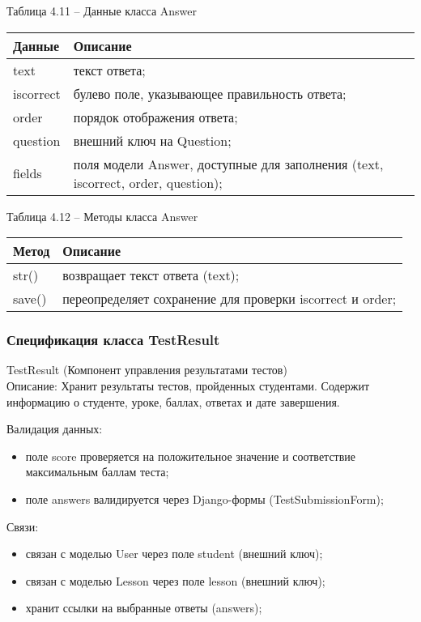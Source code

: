 Таблица 4.11 – Данные класса Answer \\
\begin{tabular}{|p{4cm}|p{8cm}|}
	\hline
	Данные & Описание \\
	\hline
	text & текст ответа; \\
	iscorrect & булево поле, указывающее правильность ответа; \\
	order & порядок отображения ответа; \\
	question & внешний ключ на Question; \\
	fields & поля модели Answer, доступные для заполнения (text, iscorrect, order, question); \\
	\hline
\end{tabular}

Таблица 4.12 – Методы класса Answer \\
\begin{tabular}{|p{4cm}|p{8cm}|}
	\hline
	Метод & Описание \\
	\hline
	str() & возвращает текст ответа (text); \\
	save() & переопределяет сохранение для проверки iscorrect и order; \\
	\hline
\end{tabular}

\subsubsection{Спецификация класса TestResult}
TestResult (Компонент управления результатами тестов) \\
Описание: Хранит результаты тестов, пройденных студентами. Содержит информацию о студенте, уроке, баллах, ответах и дате завершения.

Валидация данных: 
\begin{itemize}
	\item поле score проверяется на положительное значение и соответствие максимальным баллам теста; 
	\item поле answers валидируется через Django-формы (TestSubmissionForm); 
\end{itemize}

Связи: \\
\begin{itemize}
	\item связан с моделью User через поле student (внешний ключ); 
	\item связан с моделью Lesson через поле lesson (внешний ключ); 
	\item хранит ссылки на выбранные ответы (answers); 
\end{itemize}

